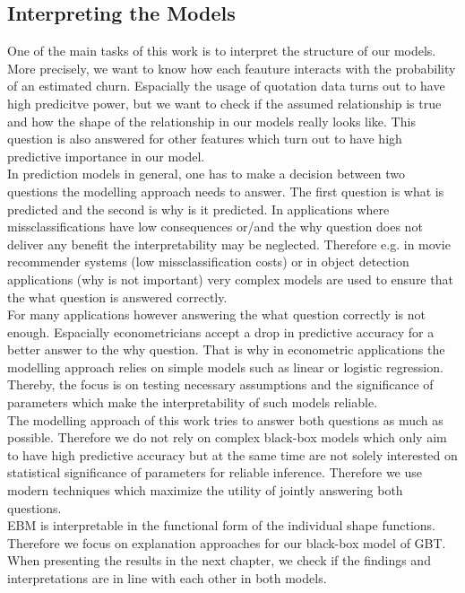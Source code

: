 \documentclass[12pt,titlepage]{article}
\begin{document}
\subsection{Interpreting the Models} \par

One of the main tasks of this work is to interpret the structure of our models. More precisely, we want to know how each feauture interacts with the probability of an estimated churn. Espacially the usage of quotation data turns out to have high predicitve power, but we want to check if the assumed relationship is true and how the shape of the relationship in our models really looks like. This question is also answered for other features which turn out to have high predictive importance in our model. \\
In prediction models in general, one has to make a decision between two questions the modelling approach needs to answer. The first question is what is predicted and the second is why is it predicted. In applications where missclassifications have low consequences or/and the why question does not deliver any benefit the interpretability may be neglected. Therefore e.g. in movie recommender systems (low missclassification costs) or in object detection applications (why is not important) very complex models are used to ensure that the what question is answered correctly. \\
For many applications however answering the what question correctly is not enough. Espacially econometricians accept a drop in predictive accuracy for a better answer to the why question. That is why in econometric applications the modelling approach relies on simple models such as linear or logistic regression. Thereby, the focus is on testing necessary assumptions and the significance of parameters which make the interpretability of such models reliable. \\
The modelling approach of this work tries to answer both questions as much as possible. Therefore we do not rely on complex black-box models which only aim to have high predictive accuracy but at the same time are not solely interested on statistical significance of parameters for reliable inference. Therefore we use modern techniques which maximize the utility of jointly answering both questions. \\
EBM is interpretable in the functional form of the individual shape functions. Therefore we focus on explanation approaches for our black-box model of GBT. When presenting the results in the next chapter, we check if the findings and interpretations are in line with each other in both models. \\
\end{document}
